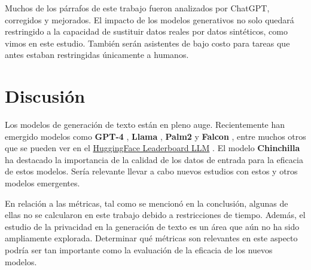 Muchos de los párrafos de este trabajo fueron analizados por ChatGPT, corregidos y mejorados. El impacto de los modelos generativos no solo quedará restringido a la capacidad de sustituir datos reales por datos sintéticos, como vimos en este estudio. También serán asistentes de bajo costo para tareas que antes estaban restringidas únicamente a humanos.


\section{Discusión}
\label{sec:discusion}
Los modelos de generación de texto están en pleno auge. Recientemente han emergido modelos como \textbf{GPT-4} \cite{openai_gpt-4_2023}, \textbf{Llama} \cite{noauthor_llama_nodate}, \textbf{Palm2} \cite{anil_palm_2023} y \textbf{Falcon} \cite{noauthor_falcon_nodate}, entre muchos otros que se pueden ver en el \href{https://huggingface.co/spaces/HuggingFaceH4/open_llm_leaderboard}{HuggingFace Leaderboard LLM} \cite{noauthor_open_nodate}. El modelo \textbf{Chinchilla} \cite{hoffmann_training_2022} ha destacado la importancia de la calidad de los datos de entrada para la eficacia de estos modelos. Sería relevante llevar a cabo nuevos estudios con estos y otros modelos emergentes.

En relación a las métricas, tal como se mencionó en la conclusión, algunas de ellas no se calcularon en este trabajo debido a restricciones de tiempo. Además, el estudio de la privacidad en la generación de texto es un área que aún no ha sido ampliamente explorada. Determinar qué métricas son relevantes en este aspecto podría ser tan importante como la evaluación de la eficacia de los nuevos modelos.
